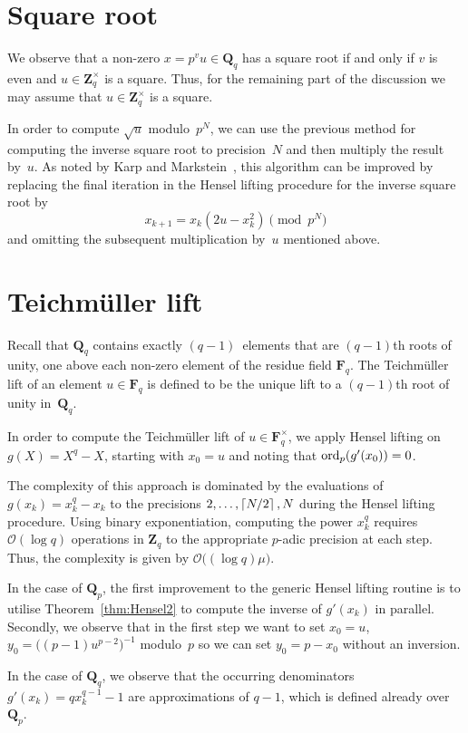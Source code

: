 \section{Square root}

We observe that a non-zero $x = p^v u \in \mathbf{Q}_q$ has a square 
root if and only if $v$ is even and $u \in \mathbf{Z}_q^{\times}$ is 
a square.  Thus, for the remaining part of the discussion we may 
assume that $u \in \mathbf{Z}_q^{\times}$ is a square.

In order to compute $\sqrt{u}$ modulo~$p^N$, we can use the previous method 
for computing the inverse square root to precision~$N$ and then multiply 
the result by~$u$.
As noted by Karp and Markstein~\citep{KarpMarkstein1997}, this algorithm 
can be improved by replacing the final iteration in the Hensel lifting 
procedure for the inverse square root by 
\begin{equation}
x_{k+1} = x_k (2 u - x_k^2) \pmod{p^N}
\end{equation}
and omitting the subsequent multiplication by~$u$ mentioned above.

\section{Teichm\"uller lift}

Recall that $\mathbf{Q}_q$ contains exactly $(q-1)$~elements that are 
$(q-1)$th roots of unity, one above each non-zero element of the residue field 
$\mathbf{F}_q$.  The Teichm\"uller lift of an element $u \in \mathbf{F}_q$ 
is defined to be the unique lift to a $(q-1)$th root of unity 
in~$\mathbf{Q}_q$.

In order to compute the Teichm\"uller lift of $u \in \mathbf{F}_q^{\times}$, 
we apply Hensel lifting on $g(X) = X^q - X$, starting with $x_0 = u$ and 
noting that $\operatorname{ord}_p(g'(x_0)) = 0$. 

The complexity of this approach is dominated by the evaluations 
of $g(x_k) = x_k^q - x_k$ to the precisions $2, \dotsc, \left\lceil N/2\right\rceil, N$ 
during the Hensel lifting procedure.  Using binary exponentiation, 
computing the power $x_k^q$ requires $\mathcal{O}(\log q)$ operations 
in $\mathbf{Z}_q$ to the appropriate $p$-adic precision at each step. 
Thus, the complexity is given by $\mathcal{O}\bigl((\log q) \mu\bigr)$.

\begin{rem}
In the case of $\mathbf{Q}_p$, the first improvement to the generic 
Hensel lifting routine is to utilise Theorem~\ref{thm:Hensel2} to 
compute the inverse of $g'(x_k)$ in parallel.
Secondly, we observe that in the first step we want to set 
$x_0 = u$, $y_0 = \bigl((p-1) u^{p-2}\bigr)^{-1}$ modulo~$p$ 
so we can set $y_0 = p - x_0$ without an inversion.

In the case of $\mathbf{Q}_q$, we observe that the occurring denominators 
$g'(x_k) = q x_k^{q-1} - 1$ are approximations of $q - 1$, which is defined 
already over $\mathbf{Q}_p$.
\end{rem}

